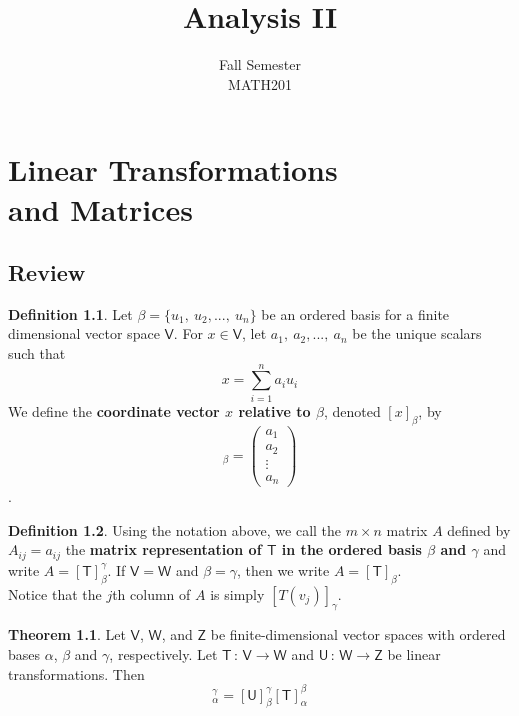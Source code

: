 \documentclass[12pt]{book}
\title{Analysis II}
\author{Fall Semester\\MATH201}
\date{}
\theoremstyle{definition}
\newtheorem{theorem}{Theorem}
\newtheorem{definition}{Definition}
\begin{document}
	\chapter{Linear Transformations\\and Matrices}
	\section*{Review}
	\begin{definition}
		Let $\beta=\{u_1,\ u_2,...,\ u_n\}$ be an ordered basis for a finite dimensional vector space $\mathsf{V}$. For $x\in \mathsf{V}$, let $a_1,\ a_2,...,\ a_n$ be the unique scalars such that
		\begin{equation*}
			x=\displaystyle\sum_{i=1} ^n a_iu_i
		\end{equation*}
	We define the \textbf{coordinate vector $x$ relative to $\beta$}, denoted $[x]_\beta$, by
		\begin{equation*}
			[x]_\beta=\begin{pmatrix}
				a_1 \\
				a_2 \\
				\vdots \\
				a_n
			\end{pmatrix}
		\end{equation*}.
	\end{definition}
	\begin{definition}
		Using the notation above, we call the $m\times n$ matrix $A$ defined by $A_{ij}=a_{ij}$ the \textbf{matrix representation of $\mathsf{T}$ in the ordered basis $\beta$ and $\gamma$} and write $A=[\mathsf{T}]_\beta^\gamma$. If $\mathsf{V}=\mathsf{W}$ and $\beta=\gamma$, then we write $A=[\mathsf{T}]_\beta$.\\
		Notice that the $j$th column of $A$ is simply $[T(v_j)]_\gamma$.
	\end{definition}
	\newpage
	\begin{theorem}
		Let $\mathsf{V}$, $\mathsf{W}$, and $\mathsf{Z}$ be finite-dimensional vector spaces with ordered bases $\alpha$, $\beta$ and $\gamma$, respectively. Let $\mathsf{T}\,:\,\mathsf{V}\rightarrow\mathsf{W}$ and $\mathsf{U}\,:\,\mathsf{W}\rightarrow\mathsf{Z}$ be linear transformations. Then
		\begin{equation*}
			[\mathsf{UT}]_\alpha^\gamma=[\mathsf{U}]_\beta^\gamma[\mathsf{T}]_\alpha^\beta
		\end{equation*}
	\end{theorem}
\end{document}
